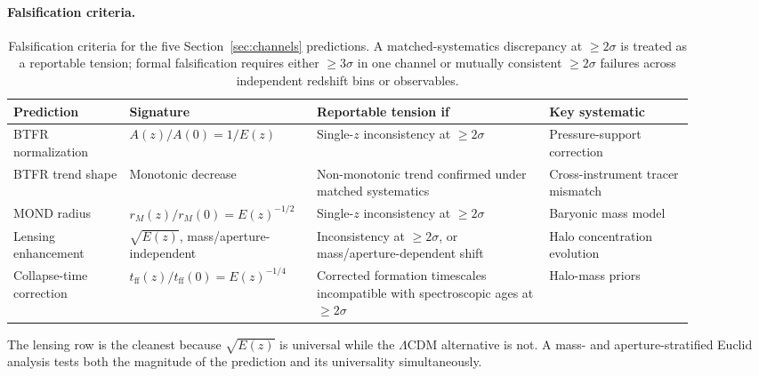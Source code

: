 \documentclass[11pt,a4paper]{article}
\numberwithin{equation}{section}
\numberwithin{table}{section}
\numberwithin{figure}{section}
\newcommand{\rM}{r_M}
\newcommand{\tff}{t_\text{ff}}
\newcommand{\Ez}{E(z)}
\begin{document}
\paragraph{Falsification criteria.}

\begin{table}[!ht]
\centering
\caption{Falsification criteria for the five Section~\ref{sec:channels}
predictions. A matched-systematics discrepancy at $\geq 2\sigma$ is
treated as a reportable tension; formal falsification requires either
$\geq 3\sigma$ in one channel or mutually consistent $\geq 2\sigma$
failures across independent redshift bins or observables.}
\label{tab:falsification}
\footnotesize
\setlength{\tabcolsep}{3pt}
\begin{tabular}{p{0.16\linewidth} p{0.21\linewidth} p{0.32\linewidth} p{0.20\linewidth}}
\toprule
Prediction & Signature & Reportable tension if & Key systematic \\
\midrule
BTFR normalization & $A(z)/A(0) = 1/\Ez$ & Single-$z$ inconsistency at $\geq 2\sigma$ & Pressure-support correction \\
BTFR trend shape & Monotonic decrease & Non-monotonic trend confirmed under matched systematics & Cross-instrument tracer mismatch \\
MOND radius & $\rM(z)/\rM(0) = \Ez^{-1/2}$ & Single-$z$ inconsistency at $\geq 2\sigma$ & Baryonic mass model \\
Lensing enhancement & $\sqrt{\Ez}$, mass/aperture-independent & Inconsistency at $\geq 2\sigma$, or mass/aperture-dependent shift & Halo concentration evolution \\
Collapse-time correction & $\tff(z)/\tff(0) = \Ez^{-1/4}$ & Corrected formation timescales incompatible with spectroscopic ages at $\geq 2\sigma$ & Halo-mass priors \\
\bottomrule
\end{tabular}
\end{table}

The lensing row is the cleanest because $\sqrt{\Ez}$ is universal while
the $\Lambda$CDM alternative is not. A mass- and aperture-stratified
Euclid analysis tests both the magnitude of the prediction and its
universality simultaneously.
\end{document}
